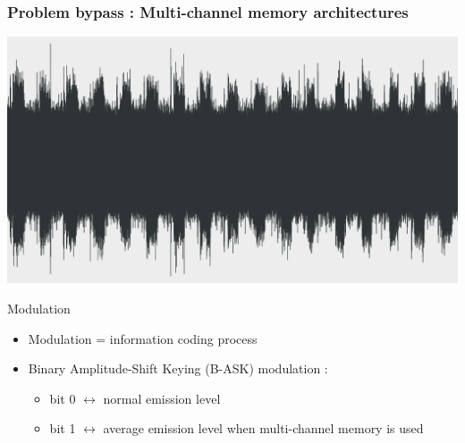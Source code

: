 \begin{frame}
\frametitle{Problem bypass : Multi-channel memory architectures}

\centering \includegraphics[scale=.2]{images/signal.png}

\begin{block}{Modulation}
\begin{itemize}
\item Modulation = information coding process
\item Binary Amplitude-Shift Keying (B-ASK) modulation :
\begin{itemize}
\item bit 0 $\leftrightarrow$ normal emission level
\item bit 1 $\leftrightarrow$ average emission level when multi-channel memory is used
\end{itemize}
\end{itemize}
\end{block}

\end{frame}